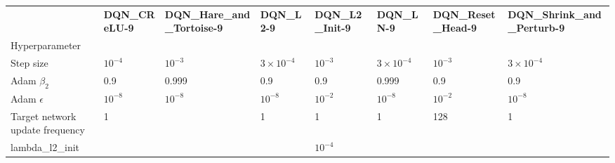 \begin{tabular}{llllllll}
 & \bfseries DQN_CReLU-9 & \bfseries DQN_Hare_and_Tortoise-9 & \bfseries DQN_L2-9 & \bfseries DQN_L2_Init-9 & \bfseries DQN_LN-9 & \bfseries DQN_Reset_Head-9 & \bfseries DQN_Shrink_and_Perturb-9 \\
Hyperparameter &  &  &  &  &  &  &  \\
Step size & $10^{-4}$ & $10^{-3}$ & $3 \times 10^{-4}$ & $10^{-3}$ & $3 \times 10^{-4}$ & $10^{-3}$ & $3 \times 10^{-4}$ \\
Adam $\beta_2$ & 0.9 & 0.999 & 0.9 & 0.9 & 0.999 & 0.9 & 0.9 \\
Adam $\epsilon$ & $10^{-8}$ & $10^{-8}$ & $10^{-8}$ & $10^{-2}$ & $10^{-8}$ & $10^{-2}$ & $10^{-8}$ \\
Target network update frequency & 1 &  & 1 & 1 & 1 & 128 & 1 \\
lambda_l2_init &  &  &  & $10^{-4}$ &  &  &  \\
\end{tabular}
